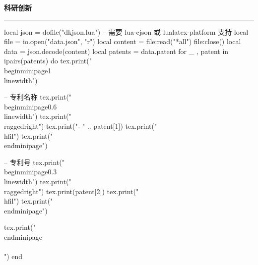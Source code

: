\documentclass[10pt, a4paper, oneside]{ctexart}
\begin{document}
\ifdefined\patent
\begin{minipage}{1\textwidth}
    \large{\textbf{科研创新}}
\end{minipage}
\rule{\linewidth}{\lineSize}
\begin{center}
    \begin{minipage}{0.9\textwidth}
        \begin{luacode}
             local json = dofile("dkjson.lua")  -- 需要 lua-cjson 或 lualatex-platform 支持
            local file = io.open("data.json", "r")
            local content = file:read("*all")
            file:close()
            local data = json.decode(content)
            local patents = data.patent
            for _ , patent in ipairs(patents) do
                tex.print("\\begin{minipage}{1\\linewidth}")

                -- 专利名称
                tex.print("\\begin{minipage}{0.6\\linewidth}")
                tex.print("\\raggedright")
                tex.print("- " .. patent[1])
                tex.print("\\hfil")
                tex.print("\\end{minipage}")

                -- 专利号
                tex.print("\\begin{minipage}{0.3\\linewidth}")
                tex.print("\\raggedright")
                tex.print(patent[2])
                tex.print("\\hfil")
                tex.print("\\end{minipage}")

                tex.print("\\end{minipage}\\\\[0.5em]")
            end
        \end{luacode}
    \end{minipage}
\end{center}
\fi
\end{document}
